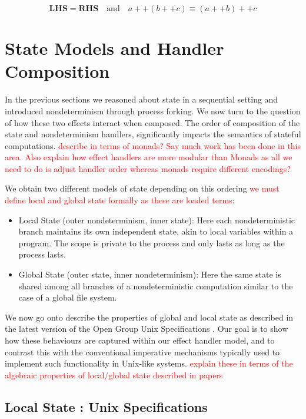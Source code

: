 \documentclass[logo,bsc,singlespacing,parskip]{infthesis}
\begin{document}
\[
\textbf{LHS} = \textbf{RHS} \quad \text{and} \quad a ++ (b ++ c) \equiv (a ++ b) ++ c
\]




\section{State Models and Handler Composition}
In the previous sections we reasoned about state in a  sequential setting and introduced nondeterminism through process forking. We now turn to the question of how these two effects interact when composed. The order of composition of the state and nondeterminism handlers, significantly impacts the semantics of stateful computations. \textcolor{red}{describe in terms of monads? Say much work has been done in this area. Also explain how effect handlers are more modular than Monads as all we need to do is adjust handler order whereas monads require different encodings? }

We obtain two different models of state depending on this ordering \textcolor{red}{we must define local and global state formally as these are loaded terms}:
\begin{itemize}
    \item Local State (outer nondeterminism, inner state): Here each nondeterministic branch maintains its own independent state, akin to local variables within a program. The scope is private to the process and only lasts as long as the process lasts.
    \item Global State (outer state, inner nondeterminism): Here the same state is shared among all branches of a nondeterministic computation similar to the case of a global file system.
\end{itemize}



We now go onto describe the properties of global and local state as described in the latest version of the Open Group Unix Specifications \cite{posix}. Our goal is to show how these behaviours are captured within our effect handler model, and to contrast this with the conventional imperative mechanisms typically used to implement such functionality in Unix-like systems. \textcolor{red}{explain these in terms of the algebraic properties of local/global state described in papers}


\subsection{Local State : Unix Specifications}
\end{document}
